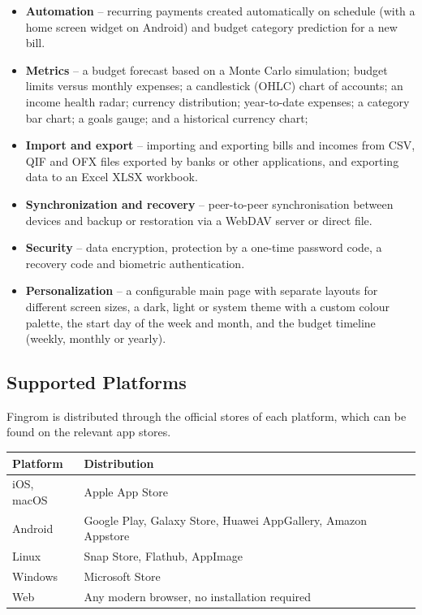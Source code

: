 \begin{itemize}
  \item \textbf{Automation} -- recurring payments created automatically on schedule (with a
  home screen widget on Android) and budget category prediction for a new bill.
  \item \textbf{Metrics} -- a budget forecast based on a Monte Carlo simulation; budget
  limits versus monthly expenses; a candlestick (OHLC) chart of accounts; an income health
  radar; currency distribution; year-to-date expenses; a category bar chart; a goals gauge;
  and a historical currency chart;
  \item \textbf{Import and export} -- importing and exporting bills and incomes from CSV, QIF
  and OFX files exported by banks or other applications, and exporting data to an Excel XLSX
  workbook.
  \item \textbf{Synchronization and recovery} -- peer-to-peer synchronisation between devices
  and backup or restoration via a WebDAV server or direct file.
  \item \textbf{Security} -- data encryption, protection by a one-time password code, a
  recovery code and biometric authentication.
  \item \textbf{Personalization} -- a configurable main page with separate layouts for
  different screen sizes, a dark, light or system theme with a custom colour palette, the
  start day of the week and month, and the budget timeline (weekly, monthly or yearly).
\end{itemize}


\subsection*{Supported Platforms}

Fingrom is distributed through the official stores of each platform, which can be found on
the relevant app stores.

\begin{center}
\begin{tabularx}{\textwidth}{|l|X|}
  \hline
  \textbf{Platform} & \textbf{Distribution} \\
  \hline
  iOS, macOS & Apple App Store \\
  \hline
  Android & Google Play, Galaxy Store, Huawei AppGallery, Amazon Appstore \\
  \hline
  Linux & Snap Store, Flathub, AppImage \\
  \hline
  Windows & Microsoft Store \\
  \hline
  Web & Any modern browser, no installation required \\
  \hline
\end{tabularx}
\end{center}

